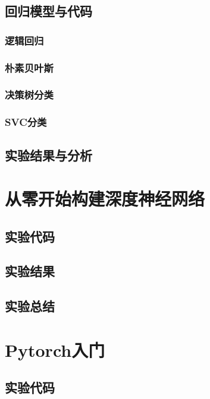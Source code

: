 \documentclass{ds201}
\begin{document}
\subsection{回归模型与代码}

\subsubsection{逻辑回归}

\subsubsection{朴素贝叶斯}

\subsubsection{决策树分类}

\subsubsection{SVC分类}

\subsection{实验结果与分析}

\section{从零开始构建深度神经网络}

\subsection{实验代码}

\subsection{实验结果}

\subsection{实验总结}

\section{Pytorch入门}

\subsection{实验代码}
\end{document}
